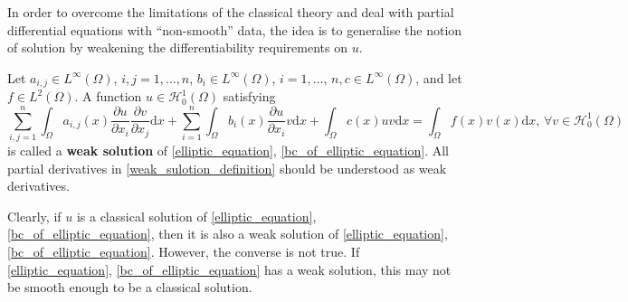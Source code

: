 In order to overcome the limitations of the classical theory and deal with partial differential equations with “non-smooth” data, the idea is to generalise the notion of solution by weakening the differentiability requirements on $u$.
\begin{defn}
	Let $a_{i, j} \in L^{\infty}(\Omega)$, $i, j = 1, \dots, n$, $b_i \in L^{\infty}(\Omega)$, $i = 1, \dots$, $n, c \in L^{\infty}(\Omega)$, and let $f \in L^2(\Omega)$. A function $u\in\mathscr{H}_{0}^{1}(\Omega)$ satisfying
	\begin{equation}
	\label{weak_sulotion_definition}
	\sum_{i,j=1}^{n} \int_{\Omega} a_{i, j}(x) \frac{\partial u}{\partial x_i} \frac{\partial v}{\partial x_j} \text{d}x + \sum_{i=1}^{n} \int_{\Omega} b_{i}(x) \frac{\partial u}{\partial x_i} v \text{d}x + \int_{\Omega} c(x)uv \text{d} x = \int_{\Omega} f(x)v(x) \text{d}x \text{,    } \forall v \in \mathscr{H}_{0}^{1}(\Omega)
	\end{equation}
	is called a \textbf{weak solution} of \eqref{elliptic_equation}, \eqref{bc_of_elliptic_equation}. All partial derivatives in \ref{weak_sulotion_definition} should be
understood as weak derivatives.
\end{defn}
Clearly, if $u$ is a classical solution of \eqref{elliptic_equation}, \eqref{bc_of_elliptic_equation}, then it is also a weak solution of \eqref{elliptic_equation}, \eqref{bc_of_elliptic_equation}. However, the converse is not true. If \eqref{elliptic_equation}, \ref{bc_of_elliptic_equation} has a weak solution, this may not be smooth enough to be a classical solution. 

